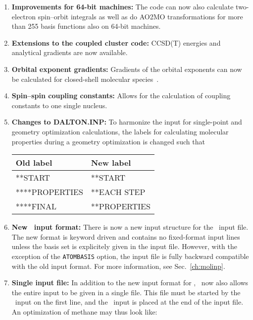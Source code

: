 \begin{enumerate}
\item{\bf Improvements for 64-bit machines:} The code can now also
  calculate two-electron spin--orbit integrals as well as do AO2MO
  transformations for more than 255 basis functions also on 64-bit
  machines.

\item{\bf Extensions to the coupled cluster code:} CCSD(T) energies
  and analytical gradients are now available.

\item{\bf Orbital exponent gradients:} Gradients of the orbital
exponents can now be calculated for closed-shell molecular
species~\cite{fjthjcp121}. 

\item{\bf Spin--spin coupling constants:} Allows for the calculation
  of coupling constants to one single nucleus.

\item{\bf Changes to DALTON.INP:} To harmonize the input for
  single-point and geometry optimization calculations, the labels for
  calculating  molecular properties during a geometry optimization is
  changed such that

\begin{center}
\begin{tabular}{|l|l|}\hline
Old label & New label\\\hline
**START & **START\\
****PROPERTIES & **EACH STEP\\
****FINAL & **PROPERTIES\\\hline
\end{tabular}
\end{center}

\item{\bf New \mol\ input format:} There is now a new input structure
  for the \mol\ input file. The new format is keyword driven and
  contains no fixed-format input lines unless the basis set is
  explicitely given in the input file. However, with the exception of
  the \verb|ATOMBASIS| option, the input file is fully backward
  compatible with the old input format. For more information, see
  Sec.~\ref{ch:molinp}.

\item{\bf Single input file:} In addition to the new input format for
  \dalton , \dalton\ now also allows the entire input to be given in a
  single file. This file must be started by the \mol\ input on the
  first line, and the \dalton\ input is placed at the end of the input
  file. An optimization of methane may thus look like:


\end{enumerate}
